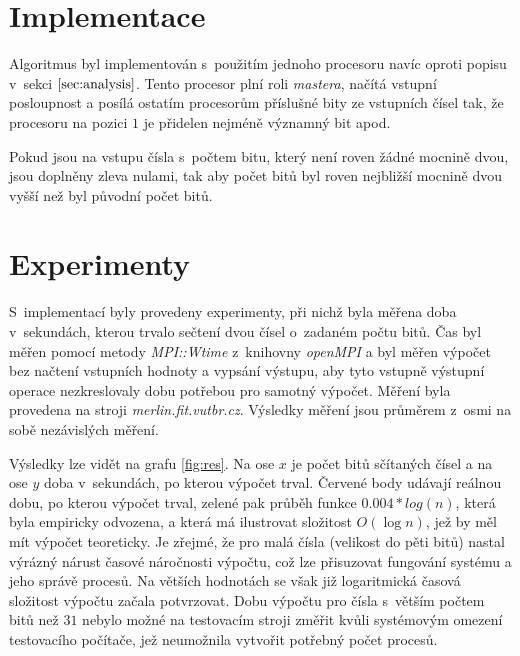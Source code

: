 \documentclass[a4paper, 12pt]{article}
\begin{document}
\section{Implementace}
\label{sec:impl}
Algoritmus byl implementován s~použitím jednoho procesoru navíc oproti popisu v~sekci $\ref{sec:analysis}$.
Tento procesor plní roli \emph{mastera}, načítá vstupní posloupnost a posílá ostatím procesorům příslušné bity
ze vstupních čísel tak, že procesoru na pozici $1$ je přidelen nejméně významný bit apod.

Pokud jsou na vstupu čísla s~počtem bitu, který není roven žádné mocnině dvou, jsou doplněny zleva nulami,
tak aby počet bitů byl roven nejbližší mocnině dvou vyšší než byl původní počet bitů.

\section{Experimenty}
\label{sec:exprmts}
S~implementací byly provedeny experimenty, při nichž byla měřena doba v~sekundách, kterou
trvalo sečtení dvou čísel o~zadaném počtu bitů.
Čas byl měřen pomocí metody \emph{MPI::Wtime} z~knihovny \emph{openMPI}
a byl měřen výpočet bez načtení vstupních hodnoty a vypsání výstupu,
aby tyto vstupně výstupní operace nezkreslovaly dobu potřebou pro samotný výpočet.
Měření byla provedena na stroji \emph{merlin.fit.vutbr.cz}.
Výsledky měření jsou průměrem z~osmi na sobě nezávislých měření.

Výsledky lze vidět na grafu \ref{fig:res}.
Na ose $x$ je počet bitů sčítaných čísel a na ose $y$ doba v~sekundách,
po kterou výpočet trval.
Červené body udávají reálnou dobu, po kterou výpočet trval, zelené
pak průběh funkce $0.004*log(n)$, která byla empiricky odvozena,
a která má ilustrovat složitost $O(\log{n})$, jež by měl mít výpočet teoreticky.
Je zřejmé, že pro malá čísla (velikost do pěti bitů) nastal
výrázný nárust časové náročnosti výpočtu, což lze přisuzovat fungování systému
a jeho správě procesů.
Na větších hodnotách se však již logaritmická časová složitost výpočtu začala potvrzovat.
Dobu výpočtu pro čísla s~větším počtem bitů než $31$ nebylo možné na testovacím stroji změřit kvůli systémovým
omezení testovacího počítače, jež neumožnila vytvořit potřebný počet procesů.
\end{document}
